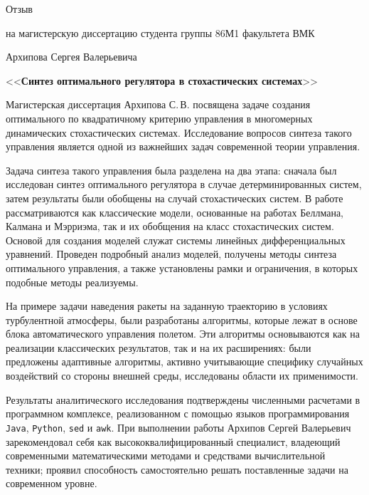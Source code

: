 \documentclass[12pt,a4paper,legalpaper,pdftex]{letter}
\begin{document}
\newcommand{\underscore}[1]{\underline{\hspace*{#1cm}}}

\newcommand{\header}[1]{\begin{center}{\fontsize{20pt}{10pt}\selectfont #1}\end{center}}
\newcommand{\subheader}[1]{\begin{center}{\fontsize{14pt}{12pt}\selectfont\center #1}\end{center}}
\newcommand{\wtitle}[1]{\begin{center}{\fontsize{18pt}{14pt}\selectfont <<\textbf{#1}>>}\end{center}}

\pagestyle{empty}


\header{Отзыв}
\subheader{на магистерскую диссертацию студента группы 86М1 факультета ВМК}
\subheader{Архипова Сергея Валерьевича}

\wtitle{Синтез оптимального регулятора в стохастических системах}

Магистерская диссертация Архипова С.\,В. посвящена задаче создания оптимального по квадратичному критерию управления в многомерных динамических стохастических системах. Исследование вопросов синтеза такого управления является одной из важнейших задач современной теории управления.

Задача синтеза такого управления была разделена на два этапа: сначала был исследован синтез оптимального регулятора в случае детерминированных систем, затем результаты были обобщены на случай стохастических систем. В работе рассматриваются как классические модели, основанные на работах Беллмана, Калмана и Мэрриэма, так и их обобщения на класс стохастических систем. Основой для создания моделей служат системы линейных дифференциальных уравнений. Проведен подробный анализ моделей, получены методы синтеза оптимального управления, а также установлены рамки и ограничения, в которых подобные методы реализуемы.

На примере задачи наведения ракеты на заданную траекторию в условиях турбулентной атмосферы, были разработаны алгоритмы, которые лежат в основе блока автоматического управления полетом. Эти алгоритмы основываются как на реализации классических результатов, так и на их расширениях: были предложены адаптивные алгоритмы, активно учитывающие специфику случайных воздействий со стороны внешней среды, исследованы области их применимости.

Результаты аналитического исследования подтверждены численными расчетами в программном комплексе, реализованном с помощью языков программирования \texttt{Java}, \texttt{Python}, \texttt{sed} и \texttt{awk}.
При выполнении работы Архипов Сергей Валерьевич зарекомендовал себя как высококвалифицированный специалист, владеющий современными математическими методами и средствами вычислительной техники; проявил способность самостоятельно решать поставленные задачи на современном уровне.
\end{document}
